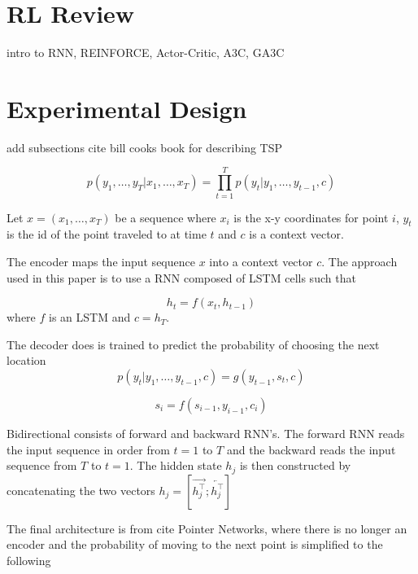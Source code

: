 \documentclass[12pt]{article}
\begin{document}
\section{RL Review}
intro to RNN, REINFORCE, Actor-Critic, A3C, GA3C

\section{Experimental Design}

add subsections
cite bill cooks book for describing TSP

\begin{equation*}
  p(y_1,\dots,y_T |x_1,\dots, x_T)=\prod_{t=1}^{T}p(y_t|y_1,\dots,y_{t-1},c)
\end{equation*}

Let $x=(x_1,\dots,x_T)$ be a sequence where $x_i$ is the x-y coordinates for point $i$, $y_t$ is the id of the point traveled to at time $t$ and $c$ is a context vector.

The encoder maps the input sequence $x$ into a context vector $c$. The approach used in this paper is to use a RNN composed of LSTM cells such that

\begin{equation*}
  h_t=f(x_t,h_{t-1})
\end{equation*}
where $f$ is an LSTM and $c=h_T$.

The decoder does is trained to predict the probability of choosing the next location
\begin{equation*}
  p(y_t|y_1,\dots,y_{t-1}, c)=g(y_{t-1},s_t, c)
\end{equation*}

\begin{equation*}
  s_i=f(s_{i-1},y_{i-1},c_i)
\end{equation*}

Bidirectional consists of forward and backward RNN's. The forward RNN reads the input sequence in order from $t=1$ to $T$ and the backward reads the input sequence from $T$ to $t=1$. The hidden state $h_j$ is then constructed by concatenating the two vectors $h_j=[\overrightarrow{h_j^\top};\overleftarrow{h_j^\top}]$


The final architecture is from cite Pointer Networks, where there is no longer an encoder and the probability of moving to the next point is simplified to the following
\end{document}
